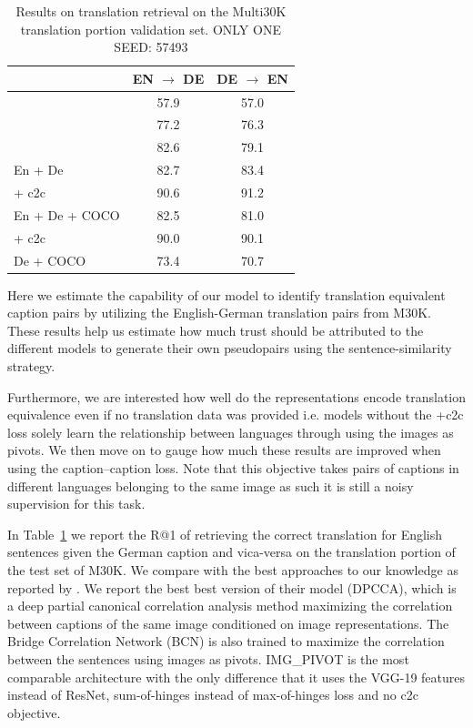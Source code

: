 \begin{table}[]
    \centering
    \begin{tabular}{lcc}
    \toprule
    & EN $\rightarrow$ DE & DE $\rightarrow$ EN \\
    \midrule
    \citet{rajendran2015bridge} & 57.9 & 57.0 \\
    \citet{D17-1303} &  77.2 & 76.3 \\
    \citet{rotman2018bridging} &  82.6 & 79.1 \\
    \midrule
    En + De & 82.7   & 83.4  \\
    \; + c2c & 90.6   & 91.2  \\
    En + De + COCO & 82.5    & 81.0    \\
    \; + c2c & 90.0   & 90.1  \\
    De + COCO & 73.4 &  70.7  \\
        \bottomrule
    \end{tabular}
    \caption{Results on translation retrieval on the Multi30K translation portion validation set. ONLY ONE SEED: 57493}
    \label{tab:translate}
\end{table}

Here we estimate the capability of our model to identify
translation equivalent caption pairs by utilizing the English-German
translation pairs from M30K. 
These results help us estimate how much 
trust should be attributed to the different models
to generate their own pseudopairs using 
the sentence-similarity strategy.

Furthermore, we are interested how well
do the representations encode translation equivalence even if 
no translation data was provided i.e. models without 
the +c2c loss solely learn the 
relationship between languages through using the images 
as pivots. We then move on to gauge how much these 
results are improved when using
the caption--caption loss. Note that this objective takes pairs
of captions in different languages belonging to the same image
as such it is still a noisy supervision for this task.


In Table~\ref{tab:translate}
we report the R@1 of retrieving the correct translation for 
English sentences given the German caption and vica-versa on 
the translation portion of the test set of M30K.
We compare with the best approaches to our knowledge as
reported by \cite{rotman2018bridging}. 
We report the best best version of their
model (DPCCA), which is a deep partial canonical correlation 
analysis method  maximizing the correlation between
captions of the same image conditioned 
on image representations. The Bridge Correlation Network (BCN) 
\cite{rajendran2015bridge} is also trained to maximize the 
correlation between the sentences using images as pivots.
IMG\_PIVOT \cite{D17-1303} is the most comparable architecture
with the only difference that it uses the VGG-19 
features instead of ResNet, sum-of-hinges instead 
of max-of-hinges loss and no c2c objective. 

